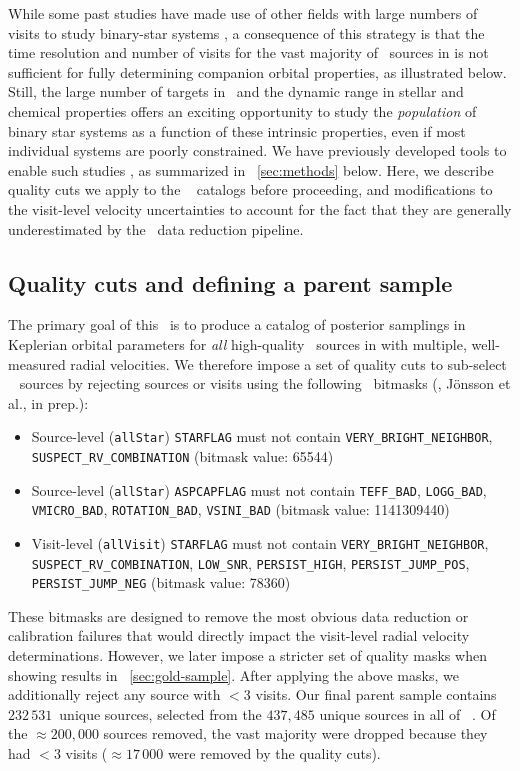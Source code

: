 \documentclass[modern]{aastex63}
\newcommand{\nsources}{\ensuremath{232\,531}}
\begin{document}
While some past studies have made use of other fields with large numbers of
visits to study binary-star systems \citep{Troup:2016, Fernandez-Trincado:2019},
a consequence of this strategy is that the time resolution and number of visits
for the vast majority of \apogee\ sources in  is not sufficient for fully
determining companion orbital properties, as illustrated below.
Still, the large number of targets in \apogee\ and the dynamic range in stellar
and chemical properties offers an exciting opportunity to study the
\emph{population} of binary star systems as a function of these intrinsic
properties, even if most individual systems are poorly constrained.
We have previously developed tools to enable such studies \citep{thejoker}, as
summarized in \sectionname~\ref{sec:methods} below.
Here, we describe quality cuts we apply to the \apogee\  catalogs before
proceeding, and modifications to the visit-level velocity uncertainties to
account for the fact that they are generally underestimated by the \apogee\ data
reduction pipeline.

\subsection{Quality cuts and defining a parent sample}

The primary goal of this \documentname\ is to produce a catalog of posterior
samplings in Keplerian orbital parameters for \emph{all} high-quality \apogee\
sources in  with multiple, well-measured radial velocities.
We therefore impose a set of quality cuts to sub-select \apogee\  sources
by rejecting sources or visits using the following \apogee\
bitmasks (\citealt{Holtzman:2018}, J\"onsson et al., in prep.):
\begin{itemize}
    \item Source-level (\texttt{allStar}) \texttt{STARFLAG} must not contain
    \texttt{VERY\_BRIGHT\_NEIGHBOR}, \texttt{SUSPECT\_RV\_COMBINATION} (bitmask
    value: 65544)
    \item Source-level (\texttt{allStar}) \texttt{ASPCAPFLAG} must not contain
    \texttt{TEFF\_BAD}, \texttt{LOGG\_BAD}, \texttt{VMICRO\_BAD},
    \texttt{ROTATION\_BAD}, \texttt{VSINI\_BAD} (bitmask value: 1141309440)
    \item Visit-level (\texttt{allVisit}) \texttt{STARFLAG} must not contain
    \texttt{VERY\_BRIGHT\_NEIGHBOR}, \texttt{SUSPECT\_RV\_COMBINATION},
    \texttt{LOW\_SNR}, \texttt{PERSIST\_HIGH}, \texttt{PERSIST\_JUMP\_POS},
    \texttt{PERSIST\_JUMP\_NEG} (bitmask value: 78360)
\end{itemize}
These bitmasks are designed to remove the most obvious data reduction or
calibration failures that would directly impact the visit-level radial velocity
determinations.
However, we later impose a stricter set of quality masks when showing results in
\sectionname~\ref{sec:gold-sample}.
After applying the above masks, we additionally reject any source with $<3$
visits.
Our final parent sample contains \nsources\ unique sources, selected from the
$437,485$ unique sources in all of \apogee\ .
Of the $\approx$$200,000$ sources removed, the vast majority were dropped
because they had $<3$ visits ($\approx$$17\,000$ were removed by the quality
cuts).
\end{document}
